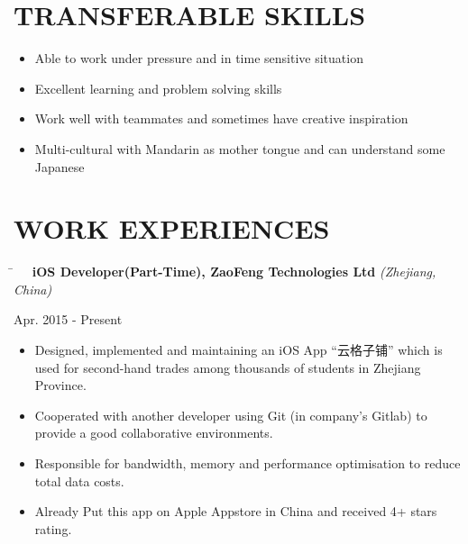 \documentclass[10pt]{article} %
\begin{document}

\section{TRANSFERABLE SKILLS}
\begin{itemize}
	\item Able to work under pressure and in time sensitive situation
	\item Excellent learning and problem solving skills
	\item Work well with teammates and sometimes have creative inspiration
	\item Multi-cultural with Mandarin as mother tongue and can understand some Japanese
\end{itemize}


\section{WORK EXPERIENCES}
\vspace{-2mm}
\parbox{0.5\textwidth}{ %
\begin{tabbing}
\hspace{4mm} \= \kill
\>\textbf{\ \ iOS Developer(Part-Time), ZaoFeng Technologies Ltd} \textit{(Zhejiang, China)}
\end{tabbing}
}
\hfill
\parbox{0.5\textwidth}{
\begin{tabbing}
Apr. 2015 - Present
\end{tabbing}
}
\vspace{-3mm}
\begin{itemize}[leftmargin=16mm]        
        \item Designed, implemented and maintaining an iOS App ``云格子铺'' which is used for second-hand trades among thousands of students in Zhejiang Province.
        \item Cooperated with another developer using Git (in company's Gitlab) to provide a good collaborative environments.
        \item Responsible for bandwidth, memory and performance optimisation to reduce total data costs.
        \item Already Put this app on Apple Appstore in China and received 4+ stars rating.
\end{itemize}
\end{document}
